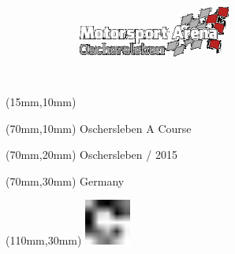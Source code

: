 \null\newpage
\begin{textblock*}{50mm}(15mm,10mm)%
\includegraphics[width=50mm]{LG/OSC.png}
\end{textblock*}
\begin{textblock*}{130mm}(70mm,10mm)%
{\fontsize{20}{20}\selectfont Oschersleben A Course}\\
\end{textblock*}
\begin{textblock*}{120mm}(70mm,20mm)%
{\fontsize{16}{16}\selectfont Oschersleben / 2015}\\
\end{textblock*}
\begin{textblock*}{120mm}(70mm,30mm)%
{\fontsize{12}{12}\selectfont Germany}
\end{textblock*}
\begin{textblock*}{30mm}(110mm,30mm)%
\centering
\includegraphics[height=15mm]{icons/fa-rotate-right.pdf}
\end{textblock*}
